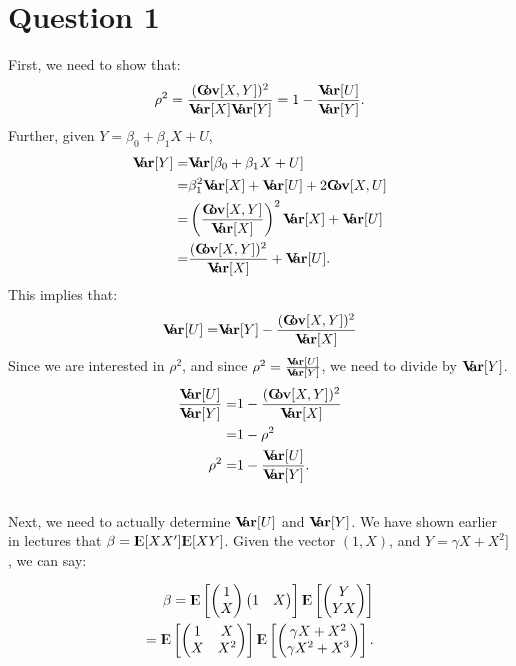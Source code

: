 \documentclass[12pt]{paper}
\newcommand{\E}{{\rm I\kern-.3em E}}
\newcommand{\Var}{{\rm \textbf{V\kern-.3em ar}}}
\newcommand{\Cov}{{\rm \textbf{C\kern-.3em ov}}}
\begin{document}
\section*{Question 1}
First, we need to show that:
\begin{align*}
\rho^2=\frac{(\Cov[X,Y])^2}{\Var[X]\Var[Y]}=1-\frac{\Var[U]}{\Var[Y]}.
\end{align*}
Further, given $Y=\beta_0+\beta_1 X+U$,
\begin{align*}
\Var[Y]=&\Var[\beta_0+\beta_1 X+U]\\
=& \beta_1^2 \Var[X]+\Var[U]+2\Cov[X,U]\\
=& \left( \frac{\Cov[X,Y]}{\Var[X]} \right)^2\Var[X]+\Var[U]\\
=&  \frac{(\Cov[X,Y])^2}{\Var[X]}+\Var[U].
\end{align*}
This implies that:
\begin{align*}
\Var[U]=& \Var[Y]-\frac{(\Cov[X,Y])^2}{\Var[X]}\\
\end{align*}
Since we are interested in $\rho^2$, and since $\rho^2=\frac{\Var[U]}{\Var[Y]}$, we need to divide by $\Var[Y]$.
\begin{align*}
\frac{\Var[U]}{\Var[Y]}=& 1-\frac{(\Cov[X,Y])^2}{\Var[X]}\\
=& 1-\rho^2\\
\rho^2=& 1-\frac{\Var[U]}{\Var[Y]}.
\end{align*}\\


Next, we need to actually determine $\Var[U]$ and $\Var[Y]$. We have shown earlier in lectures that $\beta=\E[XX']\E[XY]$. Given the vector $(1,X)$, and $Y=\gamma X + X^2]$, we can say:

\begin{align*}
\beta=\E \left[
\begin{pmatrix} 
1\\
X
\end{pmatrix}
\begin{pmatrix}
1 & X
\end{pmatrix}
\right]
\E \left[
\begin{pmatrix}
Y\\
YX
\end{pmatrix}
\right]\\
=\E \left[
\begin{pmatrix}
1 & X\\
X & X^2
\end{pmatrix}
\right]
\E \left[
\begin{pmatrix}
\gamma X+X^2\\
\gamma X^2 +X^3
\end{pmatrix}
\right].
\end{align*}
\end{document}
